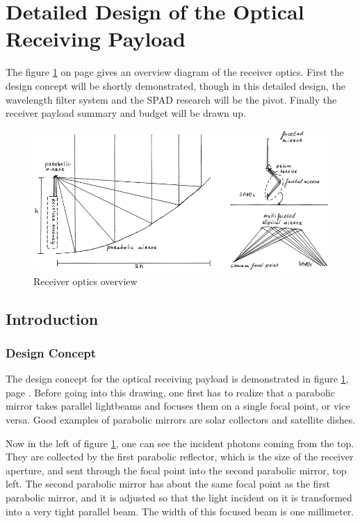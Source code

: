 \section{Detailed Design of the Optical Receiving Payload}
\label{sec:DDreceiver}
The figure \ref{fig:receiver_overview} on page \pageref{fig:receiver_overview} gives an overview diagram of the receiver optics.  First the design concept will be shortly demonstrated, though in this detailed design, the wavelength filter system and the \acl{SPAD} research will be the pivot. Finally the receiver payload summary and budget will be drawn up.

\begin{figure}[ht!]
\centering
\includegraphics[scale = 0.5]{chapters/img/DiagramReceiverGeneral.png}
\caption{Receiver optics overview}
\label{fig:receiver_overview}
\end{figure} 

\subsection{Introduction}
\subsubsection{Design Concept}
The design concept for the optical receiving payload is demonstrated in figure \ref{fig:receiver_overview}, page \pageref{fig:receiver_overview}. Before going into this drawing, one first has to realize that a parabolic mirror takes parallel lightbeams and focuses them on a single focal point, or vice versa. Good examples of parabolic mirrors are solar collectors and satellite dishes.

Now in the left of figure \ref{fig:receiver_overview}, one can see the incident photons coming from the top. They are collected by the first parabolic reflector, which is the size of the receiver aperture, and sent through the focal point into the second parabolic mirror, top left. The second parabolic mirror has about the same focal point as the first parabolic mirror, and it is adjusted so that the light incident on it is transformed into a very tight parallel beam. The width of this focused beam is one millimeter.

